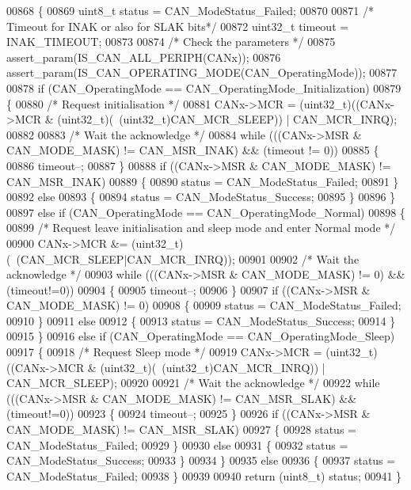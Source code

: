 \begin{DoxyCode}
00868 \{
00869   uint8\_t status = CAN_ModeStatus_Failed;
00870   
00871   \textcolor{comment}{/* Timeout for INAK or also for SLAK bits*/}
00872   uint32\_t timeout = INAK_TIMEOUT; 
00873 
00874   \textcolor{comment}{/* Check the parameters */}
00875   assert_param(IS_CAN_ALL_PERIPH(CANx));
00876   assert_param(IS_CAN_OPERATING_MODE(CAN\_OperatingMode));
00877 
00878   \textcolor{keywordflow}{if} (CAN\_OperatingMode == CAN_OperatingMode_Initialization)
00879   \{
00880     \textcolor{comment}{/* Request initialisation */}
00881     CANx->MCR = (uint32\_t)((CANx->MCR & (uint32\_t)(~(uint32\_t)CAN_MCR_SLEEP)) | 
      CAN_MCR_INRQ);
00882 
00883     \textcolor{comment}{/* Wait the acknowledge */}
00884     \textcolor{keywordflow}{while} (((CANx->MSR & CAN_MODE_MASK) != CAN_MSR_INAK) && (timeout != 0))
00885     \{
00886       timeout--;
00887     \}
00888     \textcolor{keywordflow}{if} ((CANx->MSR & CAN_MODE_MASK) != CAN_MSR_INAK)
00889     \{
00890       status = CAN_ModeStatus_Failed;
00891     \}
00892     \textcolor{keywordflow}{else}
00893     \{
00894       status = CAN_ModeStatus_Success;
00895     \}
00896   \}
00897   \textcolor{keywordflow}{else}  \textcolor{keywordflow}{if} (CAN\_OperatingMode == CAN_OperatingMode_Normal)
00898   \{
00899     \textcolor{comment}{/* Request leave initialisation and sleep mode  and enter Normal mode */}
00900     CANx->MCR &= (uint32\_t)(~(CAN\_MCR\_SLEEP|CAN_MCR_INRQ));
00901 
00902     \textcolor{comment}{/* Wait the acknowledge */}
00903     \textcolor{keywordflow}{while} (((CANx->MSR & CAN_MODE_MASK) != 0) && (timeout!=0))
00904     \{
00905       timeout--;
00906     \}
00907     \textcolor{keywordflow}{if} ((CANx->MSR & CAN_MODE_MASK) != 0)
00908     \{
00909       status = CAN_ModeStatus_Failed;
00910     \}
00911     \textcolor{keywordflow}{else}
00912     \{
00913       status = CAN_ModeStatus_Success;
00914     \}
00915   \}
00916   \textcolor{keywordflow}{else}  \textcolor{keywordflow}{if} (CAN\_OperatingMode == CAN_OperatingMode_Sleep)
00917   \{
00918     \textcolor{comment}{/* Request Sleep mode */}
00919     CANx->MCR = (uint32\_t)((CANx->MCR & (uint32\_t)(~(uint32\_t)CAN_MCR_INRQ)) | CAN\_MCR\_SLEEP);
00920 
00921     \textcolor{comment}{/* Wait the acknowledge */}
00922     \textcolor{keywordflow}{while} (((CANx->MSR & CAN_MODE_MASK) != CAN_MSR_SLAK) && (timeout!=0))
00923     \{
00924       timeout--;
00925     \}
00926     \textcolor{keywordflow}{if} ((CANx->MSR & CAN_MODE_MASK) != CAN_MSR_SLAK)
00927     \{
00928       status = CAN_ModeStatus_Failed;
00929     \}
00930     \textcolor{keywordflow}{else}
00931     \{
00932       status = CAN_ModeStatus_Success;
00933     \}
00934   \}
00935   \textcolor{keywordflow}{else}
00936   \{
00937     status = CAN_ModeStatus_Failed;
00938   \}
00939 
00940   \textcolor{keywordflow}{return}  (uint8\_t) status;
00941 \}
\end{DoxyCode}
\mbox{\label{group__CAN__Group4_ga640215e38765759d7eceb8a039046667}} 
